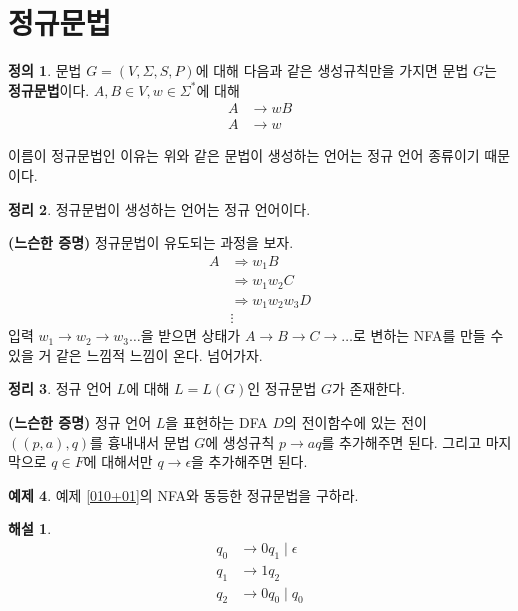 \documentclass[b5paper, 11pt]{book}
\theoremstyle{definition}
\newtheorem{defn}{정의}[chapter]
\newtheorem{thm}[defn]{정리}
\newtheorem{ex}[defn]{예제}
\newtheorem*{ans*}{해설}
\newenvironment{pf*}{\pushQED{\qed}\pf}
{\popQED\endpf}
\begin{document}
\section{정규문법}
\begin{defn} 
문법 $G = (V, \Sigma, S, P)$에 대해 다음과 같은 생성규칙만을 가지면 문법 $G$는 \textbf{정규문법}이다. $A,B \in V, w \in \Sigma^{*}$에 대해 
\begin{align*}
    A &\rightarrow wB \\ 
    A &\rightarrow w
\end{align*}
\end{defn}
이름이 정규문법인 이유는 위와 같은 문법이 생성하는 언어는 정규 언어 종류이기 때문이다.
\begin{thm}
정규문법이 생성하는 언어는 정규 언어이다.
\end{thm}
\begin{pf*}
\textbf{(느슨한 증명)} 정규문법이 유도되는 과정을 보자. 
\begin{align*}
    A &\Rightarrow w_1 B \\ 
    & \Rightarrow w_1w_2 C \\ 
    & \Rightarrow w_1w_2w_3 D \\ 
    & \vdots
\end{align*}
입력 $w_1\rightarrow w_2 \rightarrow w_3 \ldots$을 받으면  상태가 $A \rightarrow B \rightarrow C \rightarrow \ldots$로 변하는 NFA를 만들 수 있을 거 같은 느낌적 느낌이 온다. 넘어가자.
\end{pf*}
\begin{thm}
    정규 언어 $L$에 대해 $L = L(G)$인 정규문법 $G$가 존재한다. 
\end{thm}
\begin{pf*}
    \textbf{(느슨한 증명)}
    정규 언어 $L$을 표현하는 DFA $D$의 전이함수에 있는 전이 $((p, a), q)$를 흉내내서 문법 $G$에 생성규칙 $p \rightarrow aq$를 추가해주면 된다. 그리고 마지막으로 $q \in F$에 대해서만 $q \rightarrow \epsilon$을 추가해주면 된다.
\end{pf*}
\begin{ex}
    예제 \ref{010+01}의 NFA와 동등한 정규문법을 구하라. 
\end{ex}
\begin{ans*}
    \begin{align*}
        q_0 & \rightarrow 0q_1 \; \vert \; \epsilon \\ 
        q_1 & \rightarrow 1q_2 \\ 
        q_2 & \rightarrow 0q_0 \; \vert \; q_0
    \end{align*}
\end{ans*}
\end{document}
